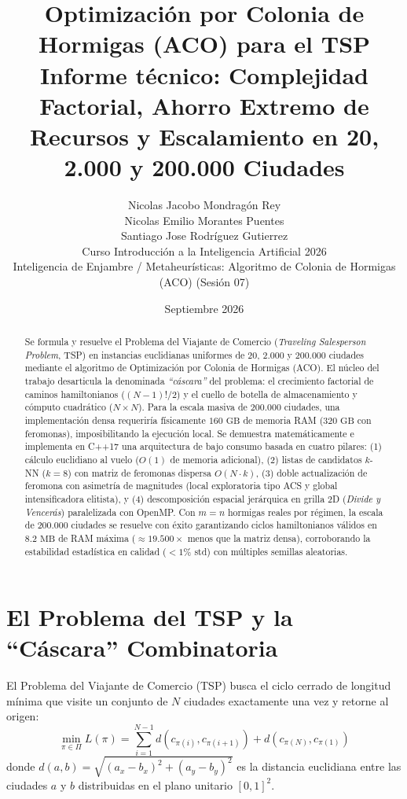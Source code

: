 \documentclass[11pt,a4paper]{article}
\title{Optimización por Colonia de Hormigas (ACO) para el TSP\\ \large Informe técnico: Complejidad Factorial, Ahorro Extremo de Recursos y Escalamiento en 20, 2.000 y 200.000 Ciudades}
\author{
  Nicolas Jacobo Mondragón Rey \\
  Nicolas Emilio Morantes Puentes \\
  Santiago Jose Rodríguez Gutierrez \\[0.8em]
  Curso Introducción a la Inteligencia Artificial 2026 \\
  \small Inteligencia de Enjambre / Metaheurísticas: Algoritmo de Colonia de Hormigas (ACO) (Sesión 07)
}
\date{Septiembre 2026}
\begin{document}
\maketitle

\begin{abstract}
Se formula y resuelve el Problema del Viajante de Comercio (\emph{Traveling Salesperson Problem}, TSP) en instancias euclidianas uniformes de $20$, $2.000$ y $200.000$ ciudades mediante el algoritmo de Optimización por Colonia de Hormigas (ACO). El núcleo del trabajo desarticula la denominada \emph{``cáscara''} del problema: el crecimiento factorial de caminos hamiltonianos ($(N-1)!/2$) y el cuello de botella de almacenamiento y cómputo cuadrático ($N \times N$). Para la escala masiva de $200.000$ ciudades, una implementación densa requeriría físicamente $160\text{ GB}$ de memoria RAM ($320\text{ GB}$ con feromonas), imposibilitando la ejecución local. Se demuestra matemáticamente e implementa en C++17 una arquitectura de bajo consumo basada en cuatro pilares: (1) cálculo euclidiano al vuelo ($O(1)$ de memoria adicional), (2) listas de candidatos $k$-NN ($k=8$) con matriz de feromonas dispersa $O(N \cdot k)$, (3) doble actualización de feromona con asimetría de magnitudes (local exploratoria tipo ACS y global intensificadora elitista), y (4) descomposición espacial jerárquica en grilla 2D (\emph{Divide y Vencerás}) paralelizada con OpenMP. Con $m=n$ hormigas reales por régimen, la escala de $200.000$ ciudades se resuelve con éxito garantizando ciclos hamiltonianos válidos en $8.2\text{ MB}$ de RAM máxima ($\approx 19.500\times$ menos que la matriz densa), corroborando la estabilidad estadística en calidad ($< 1\%$ std) con múltiples semillas aleatorias.
\end{abstract}

\newpage
\tableofcontents
\newpage

\section{El Problema del TSP y la ``Cáscara'' Combinatoria}

El Problema del Viajante de Comercio (TSP) busca el ciclo cerrado de longitud mínima que visite un conjunto de $N$ ciudades exactamente una vez y retorne al origen:
\begin{equation}
    \min_{\pi \in \Pi} L(\pi) = \sum_{i=1}^{N-1} d\left(c_{\pi(i)}, c_{\pi(i+1)}\right) + d\left(c_{\pi(N)}, c_{\pi(1)}\right)
\end{equation}
donde $d(a, b) = \sqrt{(a_x - b_x)^2 + (a_y - b_y)^2}$ es la distancia euclidiana entre las ciudades $a$ y $b$ distribuidas en el plano unitario $[0, 1]^2$.
\end{document}
